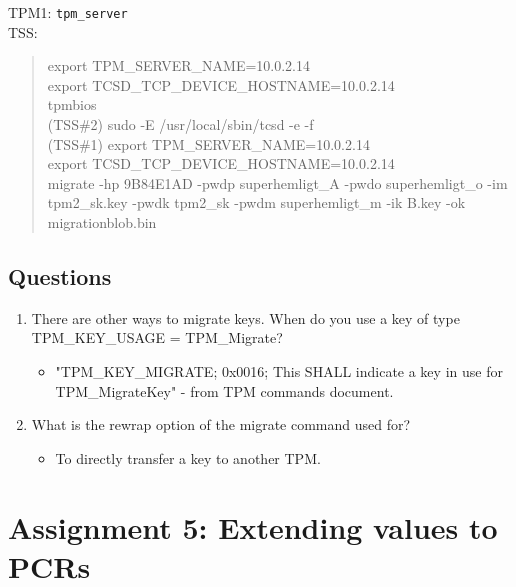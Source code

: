 \documentclass[10pt]{article}
\newcommand{\command}[1]{\texttt{#1}}
\begin{document}
TPM1:  \command{tpm\_server } \\

TSS: \\
\begin{quote}
export TPM\_SERVER\_NAME=10.0.2.14 \\
export TCSD\_TCP\_DEVICE\_HOSTNAME=10.0.2.14 \\
tpmbios \\
(TSS\#2) sudo -E /usr/local/sbin/tcsd -e -f \\

(TSS\#1) export TPM\_SERVER\_NAME=10.0.2.14 \\
export TCSD\_TCP\_DEVICE\_HOSTNAME=10.0.2.14 \\
    
migrate -hp 9B84E1AD -pwdp superhemligt\_A -pwdo superhemligt\_o -im tpm2\_sk.key -pwdk tpm2\_sk -pwdm superhemligt\_m -ik B.key -ok migrationblob.bin
\end{quote}

\subsection{Questions}
\begin{enumerate}
    \item {There are other ways to migrate keys. When do you use a key of type TPM\_KEY\_USAGE = TPM\_Migrate? }
	\begin{itemize}
	    \item {"TPM\_KEY\_MIGRATE; 0x0016; This SHALL indicate a key in use for TPM\_MigrateKey" - from TPM commands document.}
	\end{itemize}
    \item {What is the rewrap option of the migrate command used for? }
	\begin{itemize}
	    \item {To directly transfer a key to another TPM.}
	\end{itemize}
\end{enumerate}




\section{Assignment 5: Extending values to PCRs}
\end{document}
